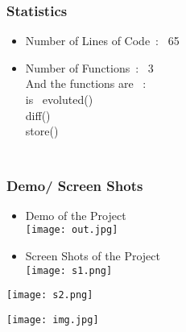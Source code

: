 \documentclass{beamer}
\begin{document}
    \begin{frame}
 \frametitle{\\ \hspace{0.3cm} \Huge Statistics}
        \begin{itemize}
      \item Number of Lines of Code\ : \ 65
      \item Number of Functions\ : \ 3\\[\baselineskip]
      And the functions are \ : \\
     \hspace{1cm}\rightarrow is \ evoluted() \\ \hspace{1.6cm} \rightarrow  diff()\\ \hspace{1.6cm} \rightarrow store()
        \end{itemize}
    \end{frame}
   
    \begin{frame}
 \frametitle{\\ \hspace{0.3cm} \Huge Demo/ Screen Shots}
 \begin{itemize}
     \item Demo of the Project\\
     \texttt{[image: out.jpg]}
     \end{itemize}
     \end{frame}
     
     \begin{frame}
    \begin{itemize}
     \item Screen Shots of the Project\\
    \texttt{[image: s1.png]}
 \end{itemize}
    \end{frame}
    \begin{frame}
     \texttt{[image: s2.png]}
    \end{frame}
    \begin{frame}
\begin{center}
     \texttt{[image: img.jpg]}
\end{center}
    \end{frame}
\end{document}
